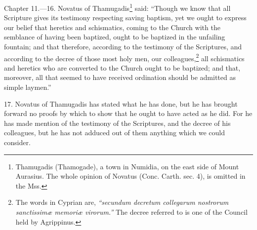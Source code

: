 
Chapter 11.—16. Novatus of Thamugadis\footnote{\par  Thamugadis (Thamogade), a town in Numidia, on the east side of Mount Aurasius. The whole opinion of Novatus (Conc. Carth. sec. 4), is omitted in the  Mss.} said: ``Though we know that all Scripture gives its testimony respecting saving baptism, yet we ought to express our belief that heretics and schismatics, coming to the Church with the semblance of having been baptized, ought to be baptized in the unfailing fountain; and that therefore, according to the testimony of the Scriptures, and according to the decree of those most holy men, our colleagues,\footnote{\par  The words in Cyprian are, \emph{``secundum decretum collegarum nostrorum sanctissimæ memoriæ virorum.''} The decree referred to is one of the Council held by Agrippinus.} all schismatics and heretics who are converted to the Church ought to be baptized; and that, moreover, all that seemed to have received ordination should be admitted as simple laymen.''

17. Novatus of Thamugadis has stated what he has done, but he has brought forward no proofs by which to show that he ought to have acted as he did. For he has made mention of the testimony of the Scriptures, and the decree of his colleagues, but he has not adduced out of them anything which we could consider.


